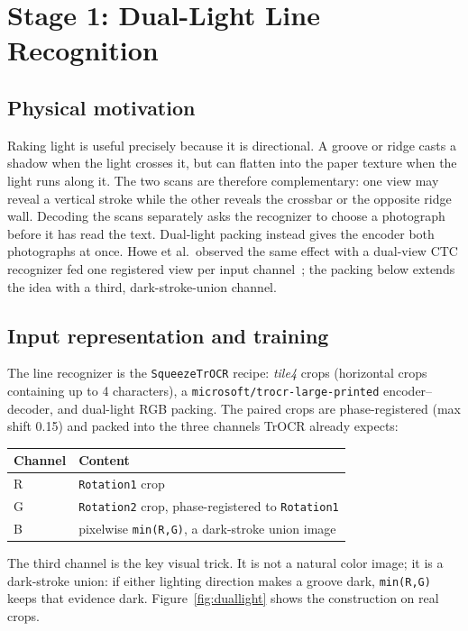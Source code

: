 \documentclass[11pt]{article}
\newcommand{\model}{\texttt{SqueezeTrOCR}}
\begin{document}
\FloatBarrier
\section{Stage 1: Dual-Light Line Recognition}
\label{sec:duallight}
\subsection{Physical motivation}
Raking light is useful precisely because it is directional. A groove or ridge casts a shadow when
the light crosses it, but can flatten into the paper texture when the light runs along it. The two
scans are therefore complementary: one view may reveal a vertical stroke while the other reveals
the crossbar or the opposite ridge wall. Decoding the scans separately asks the recognizer to
choose a photograph before it has read the text. Dual-light packing instead gives the encoder both
photographs at once. Howe et al.\ observed the same effect with a dual-view CTC recognizer fed one
registered view per input channel~\cite{howe2025}; the packing below extends the idea with a
third, dark-stroke-union channel.

\subsection{Input representation and training}
The line recognizer is the \model{} recipe: \emph{tile4} crops (horizontal crops containing up to
4 characters), a \texttt{microsoft/trocr-large-printed} encoder--decoder, and dual-light RGB
packing. The paired crops are phase-registered (max shift 0.15) and packed into the three channels
TrOCR already expects:

\begin{center}
\small
\begin{tabular}{@{}ll@{}}
\toprule
\textbf{Channel} & \textbf{Content} \\
\midrule
R & \texttt{Rotation1} crop \\
G & \texttt{Rotation2} crop, phase-registered to \texttt{Rotation1} \\
B & pixelwise \texttt{min(R,G)}, a dark-stroke union image \\
\bottomrule
\end{tabular}
\end{center}

The third channel is the key visual trick. It is not a natural color image; it is a dark-stroke
union: if either lighting direction makes a groove dark, \texttt{min(R,G)} keeps that evidence
dark. Figure~\ref{fig:duallight} shows the construction on real crops.
\end{document}
